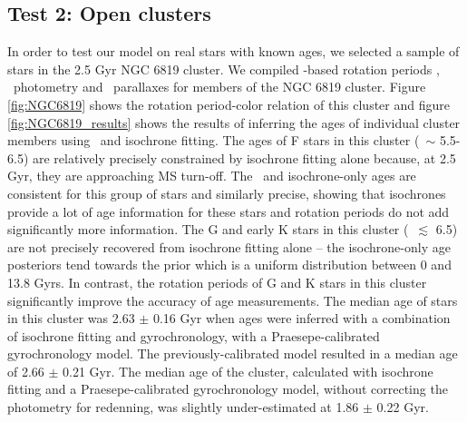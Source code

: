 \subsection{Test 2: Open clusters}
In order to test our model on real stars with known ages, we selected a sample
of stars in the 2.5 Gyr NGC 6819 cluster.
We compiled \kepler-based rotation periods \citep{meibom2015}, \Gaia\
photometry and \gaia\ parallaxes for members of the NGC 6819 cluster.
Figure \ref{fig:NGC6819} shows the rotation period-color relation of this
cluster and figure \ref{fig:NGC6819_results} shows the results of inferring
the ages of individual cluster members using \sd\ and isochrone fitting.
The ages of F stars in this cluster (\gcolor\ $\sim$ 5.5-6.5) are relatively
precisely constrained by isochrone fitting alone because, at 2.5 Gyr, they are
approaching MS turn-off.
The \sd\ and isochrone-only ages are consistent for this group of stars and
similarly precise, showing that isochrones provide a lot of age information
for these stars and rotation periods do not add significantly more
information.
The G and early K stars in this cluster (\gcolor\ $\lesssim$ 6.5) are not
precisely recovered from isochrone fitting alone -- the isochrone-only age
posteriors tend towards the prior which is a uniform distribution between 0
and 13.8 Gyrs.
In contrast, the rotation periods of G and K stars in this cluster
significantly improve the accuracy of age measurements.
The median age of stars in this cluster was 2.63 $\pm$ 0.16 Gyr when ages were
inferred with a combination of isochrone fitting and gyrochronology, with a
Praesepe-calibrated gyrochronology model.
The previously-calibrated \citet{angus2015} model resulted in a median age of
2.66 $\pm$ 0.21 Gyr.
The median age of the cluster, calculated with isochrone fitting and a
Praesepe-calibrated gyrochronology model, without correcting the photometry
for redenning, was slightly under-estimated at 1.86 $\pm$ 0.22 Gyr.

